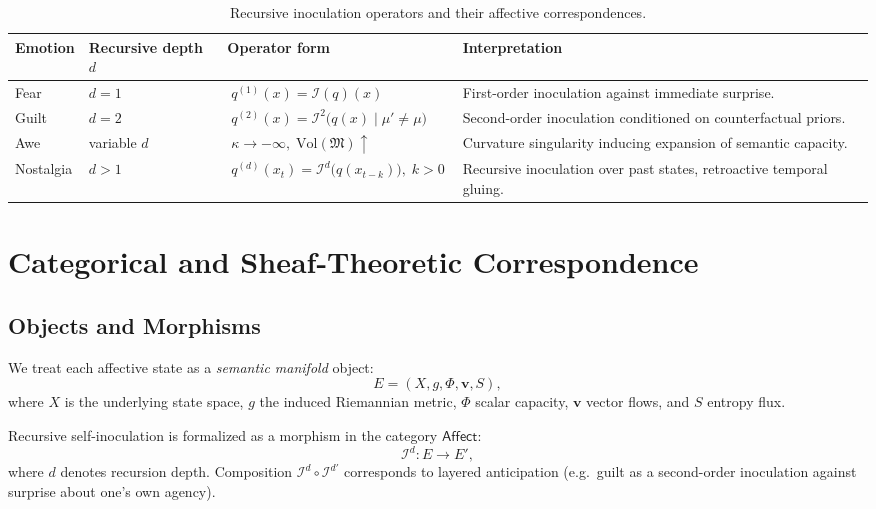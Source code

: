 \documentclass{article}
\theoremstyle{definition}
\begin{document}
\begin{table}[ht]
\centering
\caption{Recursive inoculation operators and their affective correspondences.}
\label{tab:inoculation}
\renewcommand{\arraystretch}{1.3}
\begin{tabularx}{\textwidth}{@{}l>{\centering\arraybackslash}X>{\centering\arraybackslash}X>{\centering\arraybackslash}X@{}}
\toprule
\textbf{Emotion} & \textbf{Recursive depth $d$} & \textbf{Operator form} & \textbf{Interpretation} \\
\midrule
Fear & $d=1$ &
$\;q^{(1)}(x) = \mathcal{I}(q)(x)\;$ &
First-order inoculation against immediate surprise. \\
\addlinespace
Guilt & $d=2$ &
$\;q^{(2)}(x) = \mathcal{I}^2\!\big(q(x)\mid \mu' \neq \mu\big)\;$ &
Second-order inoculation conditioned on counterfactual priors. \\
\addlinespace
Awe & variable $d$ &
$\;\kappa \to -\infty,\; \mathrm{Vol}(\mathfrak{M}) \uparrow\;$ &
Curvature singularity inducing expansion of semantic capacity. \\
\addlinespace
Nostalgia & $d>1$ &
$\;q^{(d)}(x_t) = \mathcal{I}^d\big(q(x_{t-k})\big),\; k>0\;$ &
Recursive inoculation over past states, retroactive temporal gluing. \\
\bottomrule
\end{tabularx}
\end{table}

\section{Categorical and Sheaf-Theoretic Correspondence}

\subsection{Objects and Morphisms}

We treat each affective state as a \emph{semantic manifold} object:
\[
E = (X, g, \Phi, \mathbf{v}, S),
\]
where $X$ is the underlying state space, $g$ the induced Riemannian metric, 
$\Phi$ scalar capacity, $\mathbf{v}$ vector flows, and $S$ entropy flux.

Recursive self-inoculation is formalized as a morphism in the category 
$\mathsf{Affect}$:
\[
\mathcal{I}^d : E \to E',
\]
where $d$ denotes recursion depth. Composition 
$\mathcal{I}^d \circ \mathcal{I}^{d'}$ corresponds to layered anticipation 
(e.g.\ guilt as a second-order inoculation against surprise about one’s own agency).
\end{document}
